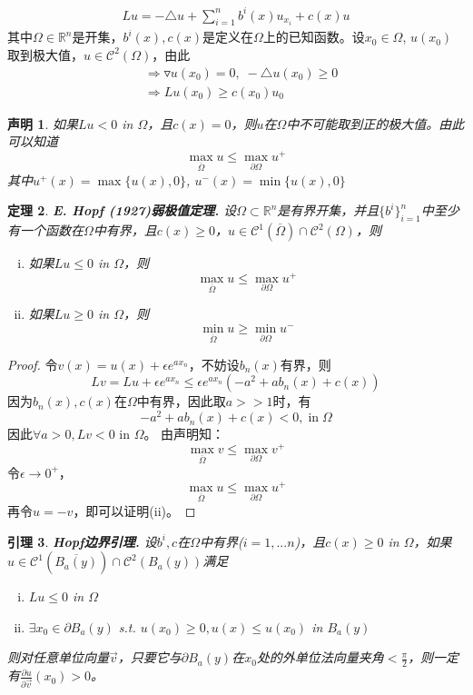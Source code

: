 \documentclass[11pt, a4paper]{article}
\theoremstyle{theorem}
\newtheorem{thm}{定理}[section]
\newtheorem{lemma}[thm]{引理}
\newtheorem{claim}[thm]{声明}
\begin{document}
\begin{align}
    \label{Q5-3-1}
    L u = - \triangle u + \sum_{i=1}^n b^i(x) u_{x_i} + c(x) u
\end{align}
其中$\Omega \in \mathbb{R}^n$是开集，$b^i(x), c(x)$是定义在$\Omega$上的已知函数。设$x_0 \in \Omega$, $u(x_0)$取到极大值，$u \in \mathcal{C}^2(\Omega)$，由此
\begin{align*}
    &\Rightarrow \triangledown u (x_0) = 0, \;  - \triangle u (x_0) \geq 0 \\
    &\Rightarrow L u(x_0) \geq c(x_0) u_0
\end{align*}

\begin{claim}
    如果$L u < 0$ in $\Omega$，且$c(x) = 0$，则$u$在$\Omega$中不可能取到正的极大值。由此可以知道
    $$
    \max\limits_{\overline{\Omega}} u \leq \max\limits_{\partial \Omega} u^+
    $$
    其中$u^+(x) = \max\{u(x), 0\}$, $u^-(x) = \min \{u(x), 0\}$
\end{claim}

\begin{thm} \textbf{E. Hopf (1927)弱极值定理. } 设$\Omega \subset \mathbb{R}^n$是有界开集，并且$\{b^i\}_{i=1}^n$中至少有一个函数在$\Omega$中有界，且$c(x) \geq 0$，$u \in \mathcal{C}^1(\overline{\Omega}) \cap \mathcal{C}^2(\Omega)$，则
\begin{enumerate}[(i)]
    \item 如果$L u \leq 0$ in $\Omega$，则
    $$
    \max\limits_{\overline{\Omega}} u \leq \max\limits_{\partial \Omega} u^+
    $$
    \item 如果$L u \geq 0$ in $\Omega$，则
    $$
    \min\limits_{\overline{\Omega}} u \geq \min\limits_{\partial \Omega} u^-
    $$
\end{enumerate}
\label{weak-max}
\end{thm}

\begin{proof}
令$v(x) = u(x) + \epsilon e^{a x_n}$，不妨设$b_n(x)$有界，则
$$
L v = L u + \epsilon e^{a x_n} \leq \epsilon e^{a x_n} (- a^2 + a b_n(x) + c(x))
$$
因为$b_n(x), c(x)$在$\Omega$中有界，因此取$a >> 1$时，有
$$
- a^2 + a b_n(x) + c(x) < 0, \; \text{in} \; \Omega
$$
因此$\forall a > 0, L v < 0$ in $\Omega$。
由声明知：
$$
\max\limits_{\overline{\Omega}}  v\leq \max\limits_{\partial \Omega} v^+
$$
令$\epsilon \rightarrow 0^+$，
$$
\max\limits_{\overline{\Omega}} u \leq \max\limits_{\partial \Omega} u^+
$$
再令$u = - v$，即可以证明(ii)。
\end{proof}

\begin{lemma} \textbf{Hopf边界引理. } 设$b^i, c$在$\Omega$中有界($i = 1,...n$)，且$c(x) \geq 0$ in $\Omega$，如果$u \in \mathcal{C}^1(\overline{B_a(y)}) \cap \mathcal{C}^2(B_a(y))$满足
\begin{enumerate}[(i)]
    \item $L u \leq 0$ in $\Omega$
    \item $\exists x_0 \in \partial B_a(y)$ s.t. $u(x_0) \geq 0, u(x) \leq u(x_0)$ in $B_a(y)$
\end{enumerate}
则对任意单位向量$\vec{v}$，只要它与$\partial B_a(y)$在$x_0$处的外单位法向量夹角$ < \frac{\pi}{2}$，则一定有$\frac{\partial u}{\partial \vec{v}}(x_0) > 0$。
\end{lemma}
\end{document}
